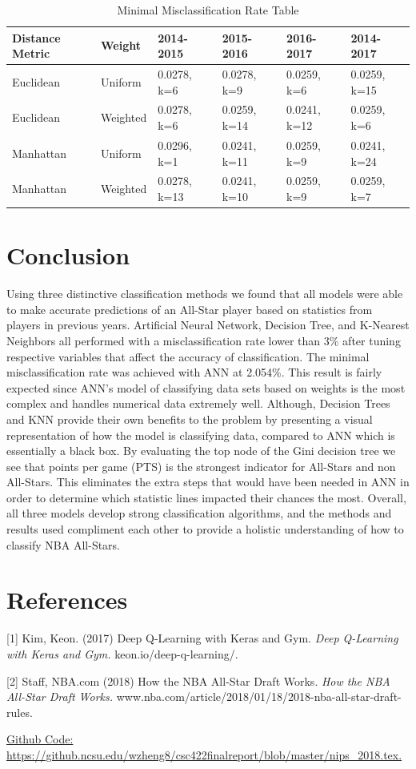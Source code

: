 \documentclass{article}
\begin{document}
\begin{table}
  \caption{Minimal Misclassification Rate Table}
  \label{Min-MR-table}
  \centering
  \begin{tabular}{llllll}
    \toprule
    Distance Metric & Weight & 2014-2015 & 2015-2016 & 2016-2017 & 2014-2017\\
    \midrule
    Euclidean & Uniform     & 0.0278, k=6   & 0.0278, k=9 & 0.0259, k=6 & 0.0259, k=15\\
    Euclidean & Weighted &  0.0278, k=6   & 0.0259, k=14 & 0.0241, k=12 & 0.0259, k=6\\
    Manhattan & Uniform     & 0.0296, k=1   & 0.0241, k=11 & 0.0259, k=9 & 0.0241, k=24\\
    Manhattan & Weighted &  0.0278, k=13   & 0.0241, k=10 & 0.0259, k=9 & 0.0259, k=7\\
    \bottomrule
  \end{tabular}
\end{table}


\section{Conclusion}
Using three distinctive classification methods we found that all models were able to make accurate predictions of an All-Star player based on statistics from players in previous years. Artificial Neural Network, Decision Tree, and K-Nearest Neighbors all performed with a misclassification rate lower than 3\% after tuning respective variables that affect the accuracy of classification. The minimal misclassification rate was achieved with ANN at 2.054\%. This result is fairly expected since ANN’s model of classifying data sets based on weights is the most complex and handles numerical data extremely well. Although, Decision Trees and KNN provide their own benefits to the problem by presenting a visual representation of how the model is classifying data, compared to ANN which is essentially a black box. By evaluating the top node of the Gini decision tree we see that points per game (PTS) is the strongest indicator for All-Stars and non All-Stars. This eliminates the extra steps that would have been needed in ANN in order to determine which statistic lines impacted their chances the most. Overall, all three models develop strong classification algorithms, and the methods and results used compliment each other to provide a holistic understanding of how to classify NBA All-Stars.

\section*{References}
\small
[1] Kim, Keon. (2017) Deep Q-Learning with Keras and Gym. {\it Deep Q-Learning with Keras and Gym.} keon.io/deep-q-learning/.

[2] Staff, NBA.com (2018) How the NBA All-Star Draft Works. {\it How the NBA All-Star Draft Works. } www.nba.com/article/2018/01/18/2018-nba-all-star-draft-rules.

\hyperlink{https://github.ncsu.edu/wzheng8/csc422finalreport/blob/master/nips_2018.tex}{Github Code: https://github.ncsu.edu/wzheng8/csc422finalreport/blob/master/nips\_2018.tex.}
\end{document}
